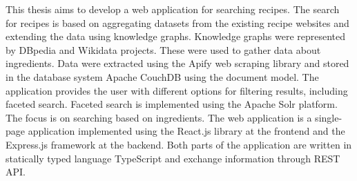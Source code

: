 \documentclass[12pt]{report}
\begin{document}

This thesis aims to develop a web application for searching recipes. The search for recipes is based on aggregating datasets from the existing recipe websites and extending the data using knowledge graphs. Knowledge graphs were represented by DBpedia and Wikidata projects. These were used to gather data about ingredients. Data were extracted using the Apify web scraping library and stored in the database system Apache CouchDB using the document model. The application provides the user with different options for filtering results, including faceted search. Faceted search is implemented using the Apache Solr platform. The focus is on searching based on ingredients. The web application is a single-page application implemented using the React.js library at the frontend and the Express.js framework at the backend. Both parts of the application are written in statically typed language TypeScript and exchange information through REST API.
\end{document}
